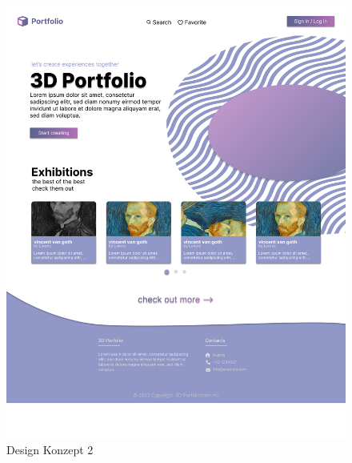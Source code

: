 \begin{figure}
    \centering
    \includegraphics[scale=0.3]{pics/DesignKonzept2.png}
    \caption{Design Konzept 2}
    \label{fig:impl:knuth}
\end{figure}

